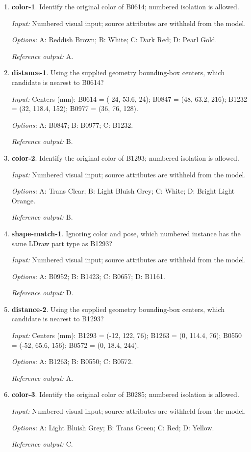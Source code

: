 \begin{enumerate}
\item \textbf{color-1}. Identify the original color of B0614; numbered isolation is allowed.\par {\small \textit{Input:} Numbered visual input; source attributes are withheld from the model. \par\textit{Options:} A: Reddish Brown; B: White; C: Dark Red; D: Pearl Gold. \par\textit{Reference output:} A.}
\item \textbf{distance-1}. Using the supplied geometry bounding-box centers, which candidate is nearest to B0614?\par {\small \textit{Input:} Centers (mm): B0614 = (-24, 53.6, 24); B0847 = (48, 63.2, 216); B1232 = (32, 118.4, 152); B0977 = (36, 76, 128). \par\textit{Options:} A: B0847; B: B0977; C: B1232. \par\textit{Reference output:} B.}
\item \textbf{color-2}. Identify the original color of B1293; numbered isolation is allowed.\par {\small \textit{Input:} Numbered visual input; source attributes are withheld from the model. \par\textit{Options:} A: Trans Clear; B: Light Bluish Grey; C: White; D: Bright Light Orange. \par\textit{Reference output:} B.}
\item \textbf{shape-match-1}. Ignoring color and pose, which numbered instance has the same LDraw part type as B1293?\par {\small \textit{Input:} Numbered visual input; source attributes are withheld from the model. \par\textit{Options:} A: B0952; B: B1423; C: B0657; D: B1161. \par\textit{Reference output:} D.}
\item \textbf{distance-2}. Using the supplied geometry bounding-box centers, which candidate is nearest to B1293?\par {\small \textit{Input:} Centers (mm): B1293 = (-12, 122, 76); B1263 = (0, 114.4, 76); B0550 = (-52, 65.6, 156); B0572 = (0, 18.4, 244). \par\textit{Options:} A: B1263; B: B0550; C: B0572. \par\textit{Reference output:} A.}
\item \textbf{color-3}. Identify the original color of B0285; numbered isolation is allowed.\par {\small \textit{Input:} Numbered visual input; source attributes are withheld from the model. \par\textit{Options:} A: Light Bluish Grey; B: Trans Green; C: Red; D: Yellow. \par\textit{Reference output:} C.}

\end{enumerate}
